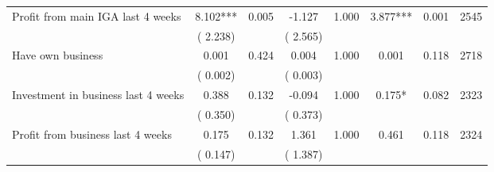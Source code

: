 \begin{tabular}{l*{7}{c}}
 Profit from main IGA last 4 weeks       &              8.102***       &        0.005  &             -1.127       &        1.000  &              3.877***       &              0.001 &  2545 \\ 
                       &       (       2.238)             &                               &       (       2.565)                     &                               &                                               &                                &                      \\ 

 Have own business       &              0.001       &        0.424  &              0.004       &        1.000  &              0.001       &              0.118 &  2718 \\ 
                       &       (       0.002)             &                               &       (       0.003)                     &                               &                                               &                                &                      \\ 

 Investment in business last 4 weeks       &              0.388       &        0.132  &             -0.094       &        1.000  &              0.175*       &              0.082 &  2323 \\ 
                       &       (       0.350)             &                               &       (       0.373)                     &                               &                                               &                                &                      \\ 

 Profit from business last 4 weeks       &              0.175       &        0.132  &              1.361       &        1.000  &              0.461       &              0.118 &  2324 \\ 
                       &       (       0.147)             &                               &       (       1.387)                     &                               &                                               &                                &                      \\ 

\hline \end{tabular}